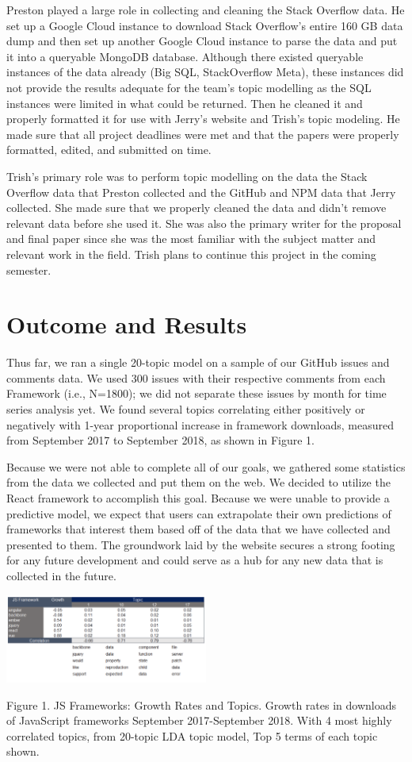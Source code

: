 \documentclass[conference]{IEEEtran}
\begin{document}
Preston played a large role in collecting and cleaning the Stack Overflow data. He set up a Google Cloud instance to download Stack Overflow's entire 160 GB data dump and then set up another Google Cloud instance to parse the data and put it into a queryable MongoDB database. Although there existed queryable instances of the data already (Big SQL, StackOverflow Meta), these instances did not provide the results adequate for the team's topic modelling as the SQL instances were limited in what could be returned. Then he cleaned it and properly formatted it for use with Jerry's website and Trish's topic modeling. He made sure that all project deadlines were met and that the papers were properly formatted, edited, and submitted on time.

Trish's primary role was to perform topic modelling on the data the Stack Overflow data that Preston collected and the GitHub and NPM data that Jerry collected. She made sure that we properly cleaned the data and didn't remove relevant data before she used it. She was also the primary writer for the proposal and final paper since she was the most familiar with the subject matter and relevant work in the field. Trish plans to continue this project in the coming semester.


\section{Outcome and Results}
Thus far, we ran a single 20-topic model on a sample of our GitHub issues and comments data. We used 300 issues with their respective comments from each Framework (i.e., N=1800); we did not separate these issues by month for time series analysis yet. We found several topics correlating either positively or negatively with 1-year proportional increase in framework downloads, measured from September 2017 to September 2018, as shown in Figure 1.

Because we were not able to complete all of our goals, we gathered some statistics from the data we collected and put them on the web. We decided to utilize the React framework to accomplish this goal. Because we were unable to provide a predictive model, we expect that users can extrapolate their own predictions of frameworks that interest them based off of the data that we have collected and presented to them. The groundwork laid by the website secures a strong footing for any future development and could serve as a hub for any new data that is collected in the future.


\includegraphics[width=0.5\textwidth]{"frame_growth"}
\caption{Figure 1.  JS Frameworks: Growth Rates and Topics.
Growth rates in downloads of JavaScript frameworks
September 2017-September 2018. 
With 4 most highly correlated topics, 
from 20-topic LDA topic model, 
Top 5 terms of each topic shown.}
\end{document}
